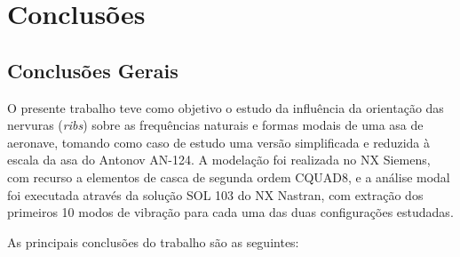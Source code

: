 \documentclass[11pt,oneside,a4paper,final]{report}
\begin{document}
\chapter{Conclusões}
\label{chap:conclusoes}

\section{Conclusões Gerais}

O presente trabalho teve como objetivo o estudo da influência da orientação das nervuras (\textit{ribs}) sobre as frequências naturais e formas modais de uma asa de aeronave, tomando como caso de estudo uma versão simplificada e reduzida à escala da asa do Antonov AN-124. A modelação foi realizada no NX Siemens, com recurso a elementos de casca de segunda ordem CQUAD8, e a análise modal foi executada através da solução SOL 103 do NX Nastran, com extração dos primeiros 10 modos de vibração para cada uma das duas configurações estudadas.

As principais conclusões do trabalho são as seguintes:
\end{document}
